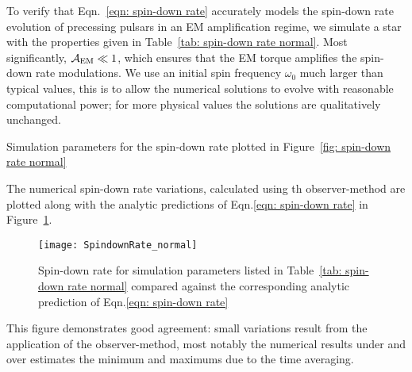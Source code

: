 \documentclass[../full_thesis/full_thesis.tex]{subfiles}
\newcommand{\thisdir}{../inertial_frame}
\begin{document}
To verify that Eqn.~\eqref{eqn: spin-down rate} accurately models the spin-down
rate evolution of precessing pulsars in an EM amplification regime, we simulate
a star with the properties given in Table~\ref{tab: spin-down rate normal}.
Most significantly, $\mathcal{A}_{\mathrm{EM}} \ll 1$, which ensures that the EM torque amplifies
the spin-down rate modulations. We use an initial spin frequency $\omega_0$
much larger than typical values, this is to allow the numerical solutions to
evolve with reasonable computational power; for more physical values the
solutions are qualitatively unchanged.
\begin{table}[htb]
\centering

\caption{Simulation parameters for the spin-down rate plotted in Figure~\ref{fig:
spin-down rate normal}}
\label{tab: spin-down rate normal}
\end{table}

The numerical spin-down rate variations, calculated using th observer-method
are plotted along with the analytic predictions of Eqn.\eqref{eqn: spin-down rate}
in Figure~\ref{fig: spin-down rate normal}.
\begin{figure}[htb]
\centering
\texttt{[image: SpindownRate\_normal]}
\caption{Spin-down rate for simulation parameters listed in Table~\ref{tab:
spin-down rate normal} compared against the corresponding analytic prediction
of Eqn.\eqref{eqn: spin-down rate} }
\label{fig: spin-down rate normal}
\end{figure}
This figure demonstrates good agreement: small variations result from the
application of the observer-method, most notably the numerical results under
and over estimates the minimum and maximums due to the time averaging.
\end{document}
